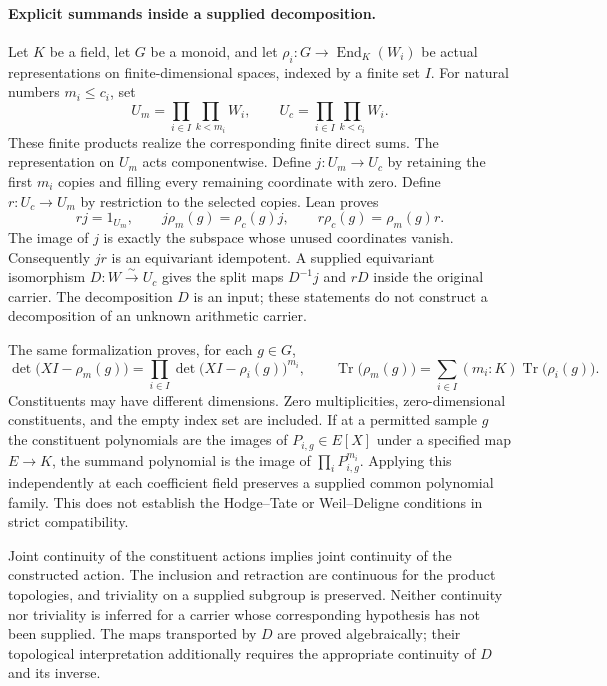 \documentclass[11pt]{article}
\theoremstyle{definition}
\theoremstyle{remark}
\begin{document}
\paragraph{Explicit summands inside a supplied decomposition.}
Let $K$ be a field, let $G$ be a monoid, and let
$\rho_i:G\to\operatorname{End}_K(W_i)$ be actual representations on
finite-dimensional spaces, indexed by a finite set $I$. For natural numbers
$m_i\le c_i$, set
\[
 U_m=\prod_{i\in I}\prod_{k<m_i}W_i,
 \qquad U_c=\prod_{i\in I}\prod_{k<c_i}W_i.
\]
These finite products realize the corresponding finite direct sums. The
representation on $U_m$ acts componentwise. Define $j:U_m\to U_c$ by retaining
the first $m_i$ copies and filling every remaining coordinate with zero.
Define $r:U_c\to U_m$ by restriction to the selected copies. Lean proves
\[
 rj=1_{U_m},\qquad
 j\rho_m(g)=\rho_c(g)j,\qquad
 r\rho_c(g)=\rho_m(g)r.
\]
The image of $j$ is exactly the subspace whose unused coordinates vanish.
Consequently $jr$ is an equivariant idempotent. A supplied equivariant
isomorphism $D:W\xrightarrow{\sim}U_c$ gives the split maps
$D^{-1}j$ and $rD$ inside the original carrier. The decomposition $D$ is an
input; these statements do not construct a decomposition of an unknown
arithmetic carrier.

The same formalization proves, for each $g\in G$,
\[
 \det\bigl(XI-\rho_m(g)\bigr)
 =\prod_{i\in I}\det\bigl(XI-\rho_i(g)\bigr)^{m_i},
 \qquad
 \operatorname{Tr}\bigl(\rho_m(g)\bigr)
 =\sum_{i\in I}(m_i:K)\operatorname{Tr}\bigl(\rho_i(g)\bigr).
\]
Constituents may have different dimensions. Zero multiplicities, zero-dimensional
constituents, and the empty index set are included. If at a permitted sample
$g$ the constituent polynomials are the images of $P_{i,g}\in E[X]$ under a
specified map $E\to K$, the summand polynomial is the image of
$\prod_iP_{i,g}^{m_i}$. Applying this independently at each coefficient field
preserves a supplied common polynomial family. This does not establish the
Hodge--Tate or Weil--Deligne conditions in strict compatibility.

Joint continuity of the constituent actions implies joint continuity of the
constructed action. The inclusion and retraction are continuous for the
product topologies, and triviality on a supplied subgroup is preserved.
Neither continuity nor triviality is inferred for a carrier whose corresponding
hypothesis has not been supplied. The maps transported by $D$ are proved
algebraically; their topological interpretation additionally requires the
appropriate continuity of $D$ and its inverse.
\end{document}
